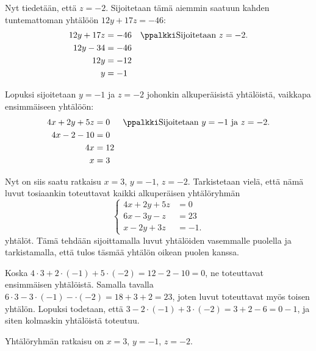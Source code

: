 \begin{esimerkki}
\begin{esimratk}
Nyt tiedetään, että $z=-2$. Sijoitetaan tämä aiemmin saatuun kahden tuntemattoman yhtälöön $12y+17z=-46$:
\begin{align*}
12y+17z&=-46 && \ppalkki \text{Sijoitetaan $z=-2$.} \\
12y-34&=-46 && \\
12y&=-12 && \\
y&=-1 && \\
\end{align*}

Lopuksi sijoitetaan $y=-1$ ja $z=-2$ johonkin alkuperäisistä yhtälöistä, vaikkapa ensimmäiseen yhtälöön:
\begin{align*}
4x+2y+5z&=0 && \ppalkki \text{Sijoitetaan $y=-1$ ja $z=-2$.} \\
4x-2-10&=0 && \\
4x&=12 && \\
x&=3 && \\
\end{align*}

Nyt on siis saatu ratkaisu $x=3$, $y=-1$, $z=-2$. Tarkistetaan vielä, että nämä luvut tosiaankin toteuttavat kaikki alkuperäisen yhtälöryhmän
\[
\left\{
\begin{aligned}
4x+2y+5z&=0 \\
6x-3y-z&= 23 \\
x-2y+3z&= -1.
\end{aligned}
\right.
\]
yhtälöt. Tämä tehdään sijoittamalla luvut yhtälöiden vasemmalle puolella ja tarkistamalla, että tulos täsmää yhtälön oikean puolen kanssa.

Koska $4 \cdot 3+2\cdot(-1)+5\cdot(-2)=12-2-10=0$, ne toteuttavat ensimmäisen yhtälöistä. Samalla tavalla $6 \cdot 3-3\cdot(-1)-\cdot(-2)=18+3+2=23$, joten luvut toteuttavat myös toisen yhtälön. Lopuksi todetaan, että $3-2\cdot(-1)+3\cdot(-2)=3+2-6=0-1$, ja siten kolmaskin yhtälöistä toteutuu.

\end{esimratk}
\begin{esimvast}
Yhtälöryhmän ratkaisu on $x=3$, $y=-1$, $z=-2$.
\end{esimvast}
\end{esimerkki}

